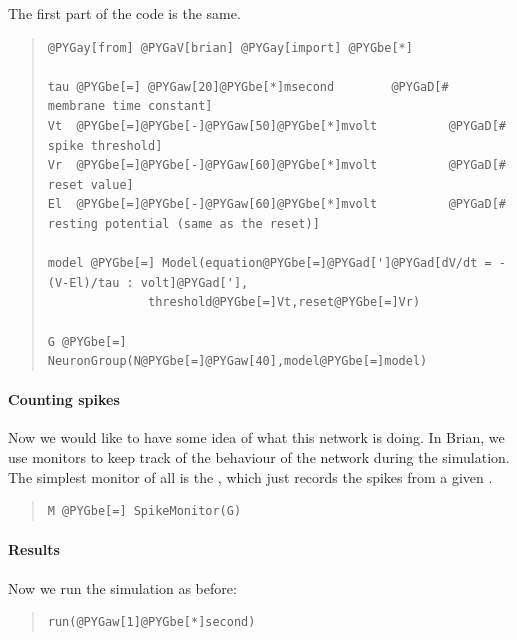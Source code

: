 \documentclass[letterpaper,10pt]{manual}
\begin{document}
The first part of the code is the same.
\begin{quote}

\begin{Verbatim}[commandchars=@\[\]]
@PYGay[from] @PYGaV[brian] @PYGay[import] @PYGbe[*]

tau @PYGbe[=] @PYGaw[20]@PYGbe[*]msecond        @PYGaD[# membrane time constant]
Vt  @PYGbe[=]@PYGbe[-]@PYGaw[50]@PYGbe[*]mvolt          @PYGaD[# spike threshold]
Vr  @PYGbe[=]@PYGbe[-]@PYGaw[60]@PYGbe[*]mvolt          @PYGaD[# reset value]
El  @PYGbe[=]@PYGbe[-]@PYGaw[60]@PYGbe[*]mvolt          @PYGaD[# resting potential (same as the reset)]

model @PYGbe[=] Model(equation@PYGbe[=]@PYGad[']@PYGad[dV/dt = -(V-El)/tau : volt]@PYGad['],
              threshold@PYGbe[=]Vt,reset@PYGbe[=]Vr)

G @PYGbe[=] NeuronGroup(N@PYGbe[=]@PYGaw[40],model@PYGbe[=]model)
\end{Verbatim}
\end{quote}


\paragraph{Counting spikes}

Now we would like to have some idea of what this network is
doing. In Brian, we use monitors to keep track of the behaviour
of the network during the simulation. The simplest monitor of
all is the \hyperlink{brian.SpikeMonitor}{}, which just records the spikes from a
given \hyperlink{brian.NeuronGroup}{}.
\begin{quote}

\begin{Verbatim}[commandchars=@\[\]]
M @PYGbe[=] SpikeMonitor(G)
\end{Verbatim}
\end{quote}


\paragraph{Results}

Now we run the simulation as before:
\begin{quote}

\begin{Verbatim}[commandchars=@\[\]]
run(@PYGaw[1]@PYGbe[*]second)
\end{Verbatim}
\end{quote}
\end{document}
